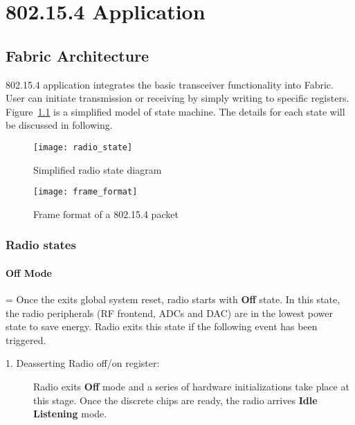 \chapter{802.15.4 Application}

\section{Fabric Architecture}
802.15.4 application integrates the basic transceiver functionality into Fabric. 
User can initiate transmission or receiving by simply writing to specific registers.
Figure~\ref{fig:radio_state} is a simplified model of state machine. The details for each state
will be discussed in following.
\begin{figure}[t]
	\centering
	\texttt{[image: radio\_state]}
	\caption{Simplified radio state diagram}
	\label{fig:radio_state}
\end{figure}

\begin{figure}[h]
\centering
	\texttt{[image: frame\_format]}
	\caption{Frame format of a 802.15.4 packet}
\end{figure}

\subsection{Radio states}
\subsubsection{Off Mode}
\hangindent=\parindent
{}
Once the \sdr exits global system reset, radio starts with {\bf Off} state.
In this state, the radio peripherals (RF frontend, ADCs and DAC) are in the 
lowest power state to save energy. Radio exits this state if the following event
has been triggered.
\begin{description}
	\item[1. Deasserting Radio off/on register:] Radio exits {\bf Off} mode
	and a series of hardware initializations take place at this stage. Once the
	discrete chips are ready, the radio arrives {\bf Idle Listening} mode.
\end{description}


